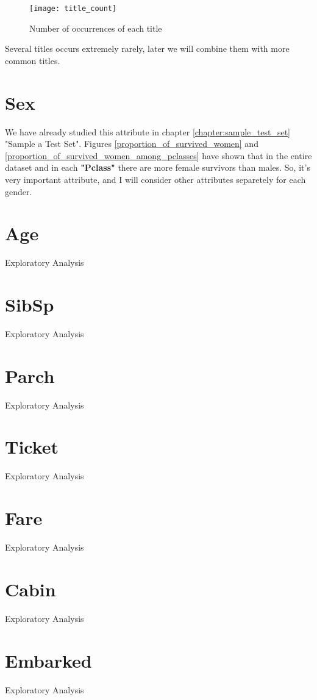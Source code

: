 \begin{figure}[!ht]
    \centering
    \texttt{[image: title\_count]}
    \caption{Number of occurrences of each title}
    \label{pic:title_count}
\end{figure}

Several titles occurs extremely rarely, later we will combine them with 
more common titles.


\section{Sex} \label{section:Sex}
We have already studied this attribute in chapter \ref{chapter:sample_test_set}
"Sample a Test Set". Figures \ref{proportion_of_survived_women} and 
\ref{proportion_of_survived_women_among_pclasses} have shown that in the 
entire dataset and in each \textbf{"Pclass"} there are more female
survivors than males. So, it's very important attribute, and I will
consider other attributes separetely for each gender.


\section{Age} \label{section:Age}
Exploratory Analysis


\section{SibSp} \label{section:SibSp}
Exploratory Analysis


\section{Parch} \label{section:Parch}
Exploratory Analysis


\section{Ticket} \label{section:Ticket}
Exploratory Analysis


\section{Fare} \label{section:Fare}
Exploratory Analysis


\section{Cabin} \label{section:Cabin}
Exploratory Analysis


\section{Embarked} \label{section:Embarked}
Exploratory Analysis